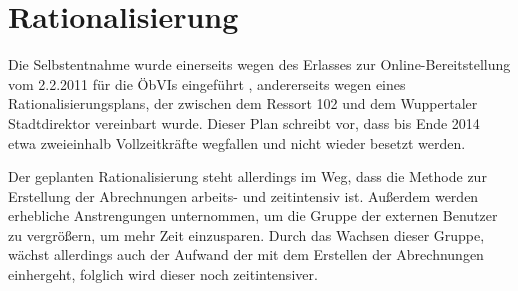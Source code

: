 
\section{Rationalisierung} \label{sec:rationalisierung}
Die Selbstentnahme wurde einerseits wegen des Erlasses zur Online-Bereitstellung vom 2.2.2011 für die \acp{ÖbVI} eingeführt \autocite[vgl.][]{wupp-wunda-oebvi}, andererseits wegen eines Rationalisierungsplans, der zwischen dem Ressort 102 und dem Wuppertaler Stadtdirektor vereinbart wurde.
Dieser Plan schreibt vor, dass bis Ende 2014 etwa zweieinhalb  Vollzeitkräfte wegfallen und nicht wieder besetzt werden.

Der geplanten Rationalisierung steht allerdings im Weg, dass die Methode zur Erstellung der Abrechnungen arbeits- und zeitintensiv ist.
Außerdem werden erhebliche Anstrengungen unternommen, um die Gruppe der externen Benutzer zu vergrößern, um mehr Zeit einzusparen.
Durch das Wachsen dieser Gruppe, wächst allerdings auch der Aufwand der mit dem Erstellen der Abrechnungen einhergeht, folglich wird dieser noch zeitintensiver.

